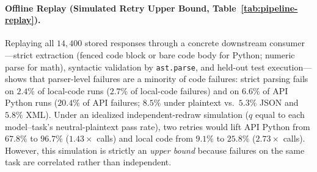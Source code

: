 \documentclass[a4paper,fleqn]{cas-sc}
\begin{document}
\paragraph{Offline Replay (Simulated Retry Upper Bound, Table~\ref{tab:pipeline-replay}).}
Replaying all $14{,}400$ stored responses through a concrete downstream consumer---strict extraction (fenced code block or bare code body for Python; numeric parse for math), syntactic validation by \texttt{ast.parse}, and held-out test execution---shows that parser-level failures are a minority of code failures: strict parsing fails on $2.4\%$ of local-code runs ($2.7\%$ of local-code failures) and on $6.6\%$ of API Python runs ($20.4\%$ of API failures; $8.5\%$ under plaintext vs.\ $5.3\%$ JSON and $5.8\%$ XML). Under an idealized independent-redraw simulation ($q$ equal to each model--task's neutral-plaintext pass rate), two retries would lift API Python from $67.8\%$ to $96.7\%$ ($1.43\times$ calls) and local code from $9.1\%$ to $25.8\%$ ($2.73\times$ calls). However, this simulation is strictly an \emph{upper bound} because failures on the same task are correlated rather than independent.
\end{document}
